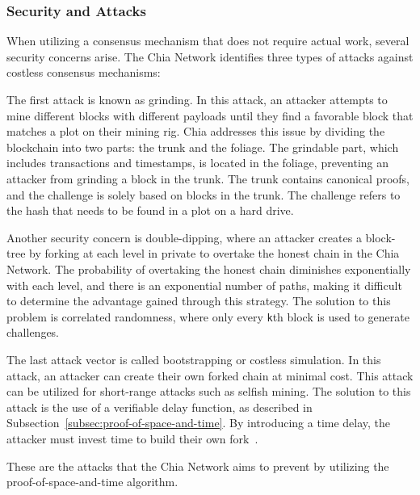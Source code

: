 \subsubsection{Security and Attacks}
When utilizing a consensus mechanism that does not require actual work, several security concerns arise.
The Chia Network identifies three types of attacks against costless consensus mechanisms:

The first attack is known as grinding.
In this attack, an attacker attempts to mine different blocks with different payloads until they find a favorable block that matches a plot on their mining rig.
Chia addresses this issue by dividing the blockchain into two parts: the trunk and the foliage.
The grindable part, which includes transactions and timestamps, is located in the foliage, preventing an attacker from grinding a block in the trunk.
The trunk contains canonical proofs, and the challenge is solely based on blocks in the trunk.
The challenge refers to the hash that needs to be found in a plot on a hard drive.

Another security concern is double-dipping, where an attacker creates a block-tree by forking at each level in private to overtake the honest chain in the Chia Network.
The probability of overtaking the honest chain diminishes exponentially with each level, and there is an exponential number of paths, making it difficult to determine the advantage gained through this strategy.
The solution to this problem is correlated randomness, where only every \texttt{k}th block is used to generate challenges.

The last attack vector is called bootstrapping or costless simulation.
In this attack, an attacker can create their own forked chain at minimal cost.
This attack can be utilized for short-range attacks such as selfish mining.
The solution to this attack is the use of a verifiable delay function, as described in Subsection~\ref{subsec:proof-of-space-and-time}.
By introducing a time delay, the attacker must invest time to build their own fork~\cite{chia-greenpaper}.

These are the attacks that the Chia Network aims to prevent by utilizing the proof-of-space-and-time algorithm.


